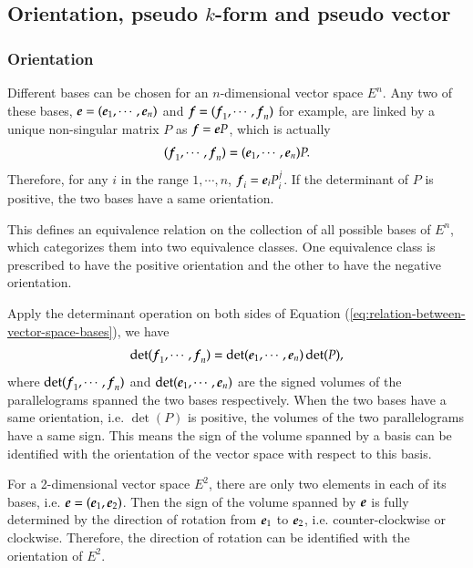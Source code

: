 \documentclass[11pt, a4paper]{book}
\begin{document}
\subsection{Orientation, pseudo $k$-form and pseudo vector}

\subsubsection{Orientation}

\begin{Definition}
  \label{def:vector-space-orientation}
  Different bases can be chosen for an $n$-dimensional vector space $E^n$. Any two of
  these bases, $\boldsymbol{e} = (\boldsymbol{e}_1,\cdots,\boldsymbol{e}_n)$ and
  $\boldsymbol{f} = (\boldsymbol{f}_1,\cdots,\boldsymbol{f}_n)$ for example, are linked by a unique
  non-singular matrix $P$ as $\boldsymbol{f} = \boldsymbol{e} P$, which is actually
  \begin{equation}
    \label{eq:relation-between-vector-space-bases}
    (\boldsymbol{f}_1,\cdots,\boldsymbol{f}_n) = (\boldsymbol{e}_1,\cdots,\boldsymbol{e}_n) P.
  \end{equation}
  Therefore, for any $i$ in the range $1,\cdots,n$, $\boldsymbol{f}_i = \boldsymbol{e}_i P^j_i$. If
  the determinant of $P$ is positive, the two bases have a same orientation.

  This defines an equivalence relation on the collection of all possible bases of $E^n$,
  which categorizes them into two equivalence classes. One equivalence class is prescribed
  to have the positive orientation and the other to have the negative orientation.
\end{Definition}

Apply the determinant operation on both sides of Equation
(\ref{eq:relation-between-vector-space-bases}), we have
\begin{equation*}
  \det(\boldsymbol{f}_1,\cdots,\boldsymbol{f}_n) = \det(\boldsymbol{e}_1,\cdots,\boldsymbol{e}_n) \det(P),
\end{equation*}
where $\det(\boldsymbol{f}_1,\cdots,\boldsymbol{f}_n)$ and $\det(\boldsymbol{e}_1,\cdots,\boldsymbol{e}_n)$ are
the signed volumes of the parallelograms spanned the two bases respectively. When the two
bases have a same orientation, i.e. $\det(P)$ is positive, the volumes of the two
parallelograms have a same sign. This means the sign of the volume spanned by a basis can
be identified with the orientation of the vector space with respect to this basis.

\begin{Example}
  For a 2-dimensional vector space $E^2$, there are only two elements in each of its
  bases, i.e. $\boldsymbol{e} =(\boldsymbol{e}_1,\boldsymbol{e}_2)$. Then the sign of the volume spanned by
  $\boldsymbol{e}$ is fully determined by the direction of rotation from $\boldsymbol{e}_1$ to
  $\boldsymbol{e}_2$, i.e. counter-clockwise or clockwise. Therefore, the direction of rotation
  can be identified with the orientation of $E^2$.
\end{Example}
\end{document}
